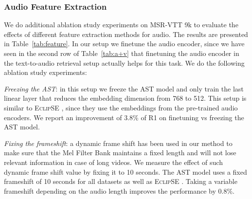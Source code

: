 \documentclass[10pt,twocolumn,letterpaper]{article}
\begin{document}
\begin{table*}[hbt!]
\centering
{}
 \caption{An evaluation of alternative fusion types for the audio and video embeddings. The visual comparisons of these fusion methods are illustrated in Figure~\ref{fusion}. }
  \label{tab:fusion}
\end{table*}

\subsubsection{Audio Feature Extraction}
We do additional ablation study experiments on MSR-VTT 9k to evaluate the effects of different feature extraction methods for audio. The results are presented in Table~\ref{tab:feature}. In our setup we finetune the audio encoder, since we have seen in the second row of Table~\ref{tab:a+v} that finetuning the audio encoder in the text-to-audio retrieval setup actually helps for this task. We do the following ablation study experiments:


\noindent \textit{Freezing the AST}: in this setup we freeze the AST model and only train the last linear layer that reduces the embedding dimension from 768 to 512. This setup is similar to E\textsc{clip}SE \cite{ECLIPSE_ECCV22}, since they use the embeddings from the pre-trained audio encoders. We report an improvement of 3.8\% of R1 on finetuning vs freezing the AST model.
    
\noindent \textit{Fixing the frameshift}: a dynamic frame shift has been used in our method to make sure that the Mel Filter Bank maintains a fixed length and will not lose relevant information in case of long videos. We measure the effect of such dynamic frame shift value by fixing it to 10 seconds. The AST model uses a fixed frameshift of 10 seconds for all datasets as well as E\textsc{clip}SE \cite{ECLIPSE_ECCV22}. Taking a variable frameshift depending on the audio length improves the performance by 0.8\%.
\end{document}
